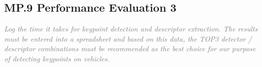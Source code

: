 \documentclass[a4paper]{scrartcl}
\begin{document}
\subsection*{MP.9 Performance Evaluation 3}
\textcolor{gray}{\textit{Log the time it takes for keypoint detection and descriptor extraction. The results must be entered into a spreadsheet and based on this data, the TOP3 detector / descriptor combinations must be recommended as the best choice for our purpose of detecting keypoints on vehicles.}}
\end{document}
